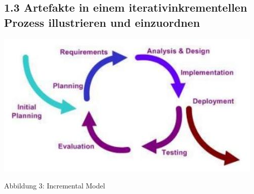 \subsection*{1.3 Artefakte in einem iterativinkrementellen Prozess illustrieren und einzuordnen}
\begin{center}
\includegraphics[width=\textwidth]{images/2024_12_29_0d1d7b5551ea1b4b41bdg-02(1)}
\end{center}

Abbildung 3: Incremental Model